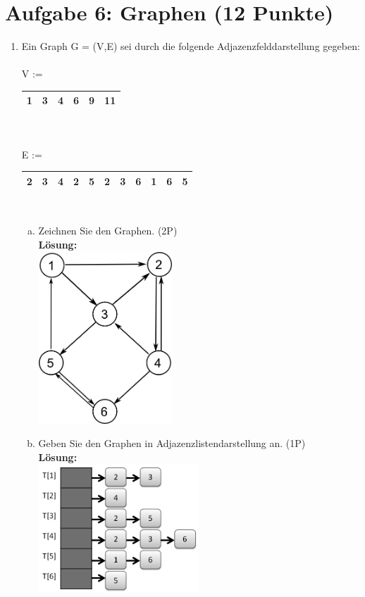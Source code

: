 \documentclass{scrartcl}
\begin{document}
\section*{Aufgabe 6: Graphen (12 Punkte)}
\begin{enumerate}[(1)]
\item Ein Graph G = (V,E) sei durch die folgende Adjazenzfelddarstellung gegeben:\\
\ \\
V := \begin{tabular}{|c|c|c|c|c|c|}
\hline 
1 & 3 & 4 & 6 & 9 & 11 \\ 
\hline 
\end{tabular}  \\
\ \\
E := \begin{tabular}{|c|c|c|c|c|c|c|c|c|c|c|}
\hline 
2 & 3 & 4 & 2 & 5 & 2 & 3 & 6 & 1 & 6 & 5 \\ 
\hline 
\end{tabular}\\
\begin{enumerate}[(a)]
	\item Zeichnen Sie den Graphen. (2P)\\
	\textbf{Lösung:}\\
	\includegraphics[width=5cm]{images/Graphdarstellungsaufgabe}
	\item Geben Sie den Graphen in Adjazenzlistendarstellung an. (1P)\\
	\textbf{Lösung:}\\
	\includegraphics[width=6cm]{images/AdjazenzlisteSW}

\end{enumerate}
\end{enumerate}
\end{document}
